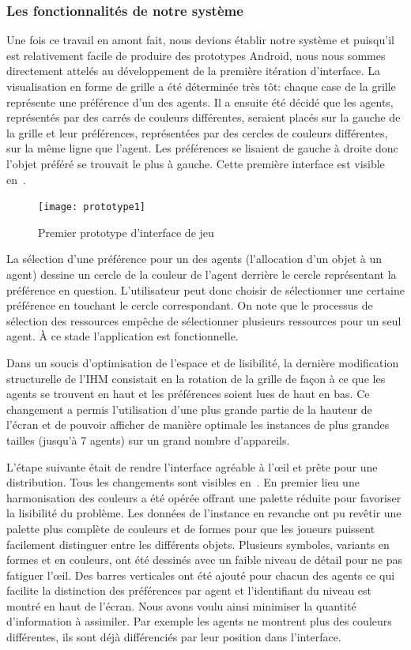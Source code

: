 \documentclass[../main.tex]{subfiles}
\begin{document}
	\subsubsection{Les fonctionnalités de notre système}

Une fois ce travail en amont fait, nous devions établir notre système et puisqu'il est relativement facile de produire des prototypes Android, nous nous sommes directement attelés au développement de la première itération d'interface. La visualisation en forme de grille a été déterminée très tôt: chaque case de la grille représente une préférence d'un des agents. Il a ensuite été décidé que les agents, représentés par des carrés de couleurs différentes, seraient placés sur la gauche de la grille et leur préférences, représentées par des cercles de couleurs différentes, sur la même ligne que l'agent. Les préférences se lisaient de gauche à droite donc l'objet préféré se trouvait le plus à gauche. Cette première interface est visible en~.

\begin{figure}[ht!]
\centering
\texttt{[image: prototype1]}
\caption{Premier prototype d'interface de jeu}
\label{fig-prototype1}
\end{figure}

La sélection d'une préférence pour un des agents (l'allocation d'un objet à un agent) dessine un cercle de la couleur de l'agent derrière le cercle représentant la préférence en question. L'utilisateur peut donc choisir de sélectionner une certaine préférence en touchant le cercle correspondant. On note que le processus de sélection des ressources empêche de sélectionner plusieurs ressources pour un seul agent. À ce stade l'application est fonctionnelle.

Dans un soucis d'optimisation de l'espace et de lisibilité, la dernière modification structurelle de l'IHM consistait en la rotation de la grille de façon à ce que les agents se trouvent en haut et les préférences soient lues de haut en bas. Ce changement a permis l'utilisation d'une plus grande partie de la hauteur de l'écran et de pouvoir afficher de manière optimale les instances de plus grandes tailles (jusqu'à 7 agents) sur un grand nombre d'appareils.

L'étape suivante était de rendre l'interface agréable à l'œil et prête pour une distribution. Tous les changements sont visibles en~. En premier lieu une harmonisation des couleurs a été opérée offrant une palette réduite pour favoriser la lisibilité du problème. Les données de l'instance en revanche ont pu revêtir une palette plus complète de couleurs et de formes pour que les joueurs puissent facilement distinguer entre les différents objets. Plusieurs symboles, variants en formes et en couleurs, ont été dessinés avec un faible niveau de détail pour ne pas fatiguer l'œil. Des barres verticales ont été ajouté pour chacun des agents ce qui facilite la distinction des préférences par agent et l'identifiant du niveau est montré en haut de l'écran. Nous avons voulu ainsi minimiser la quantité d'information à assimiler. Par exemple les agents ne montrent plus des couleurs différentes, ils sont déjà différenciés par leur position dans l'interface.
\end{document}
